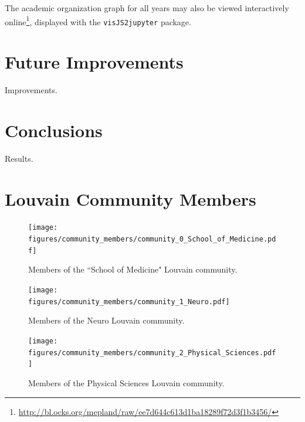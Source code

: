 \documentclass[notitlepage,aps,prd,nofootinbib]{revtex4-1}
\newcommand{\figures}{../outputs/plots}
\newcommand{\includedir}{../latex_files}
\begin{document}
The academic organization graph for all years may also be viewed interactively online\footnote{\url{http://bl.ocks.org/mepland/raw/ee7d644c613d1ba18289f72d3f1b3456/}}, displayed with the \texttt{visJS2jupyter} \cite{visJS2jupyter} package.

\section{Future Improvements}
Improvements.

\section{Conclusions}
Results.





\newpage %

\appendix*
\section{Louvain Community Members}

\begin{figure}[!htb]\centering
  \texttt{[image: \\figures/community\_members/community\_0\_School\_of\_Medicine.pdf]}
  \caption{Members of the ``School of Medicine" Louvain community.}
\end{figure}

\begin{figure}[!htb]\centering
  \texttt{[image: \\figures/community\_members/community\_1\_Neuro.pdf]}
  \caption{Members of the Neuro Louvain community.}
\end{figure}

\begin{figure}[!htb]\centering
  \texttt{[image: \\figures/community\_members/community\_2\_Physical\_Sciences.pdf]}
  \caption{Members of the Physical Sciences Louvain community.}
\end{figure}
\end{document}
